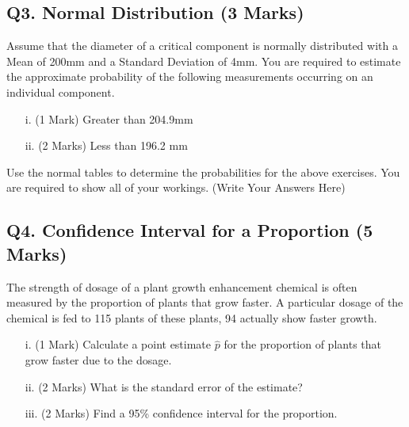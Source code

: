 \documentclass[a4paper,12pt]{article}
\begin{document}
\subsection*{Q3. Normal Distribution (3 Marks)} %
Assume that the diameter of a critical component is normally distributed with a Mean of 200mm and a Standard Deviation of 4mm. You are required  to estimate the approximate probability of the following measurements occurring on an individual component.
\begin{itemize}
	\item[i.](1 Mark)	Greater than 204.9mm
	\item[ii.](2 Marks) Less than 196.2 mm
\end{itemize}
\bigskip
\noindent Use the normal tables to determine the probabilities for the above exercises. You are required to show all of your workings.
\newpage
(Write Your Answers Here)
\newpage
\vspace{0.25cm}
\subsection*{Q4. Confidence Interval for a Proportion (5 Marks)}
The strength of dosage of a plant growth enhancement chemical is often measured by the proportion of plants that grow faster. A particular dosage of the chemical is fed to 115 plants of these plants, 94 actually show faster growth.

\begin{itemize}
	\item[i.] (1 Mark) Calculate a point estimate $\hat{p}$ for the proportion of plants that grow faster due to the dosage. 									 
	\item[ii.] (2 Marks)  What is the standard error of the estimate? 			
	\item[iii.] (2 Marks) Find a 95\% confidence interval for the proportion. 					
 								 \end{itemize}
\end{document}
